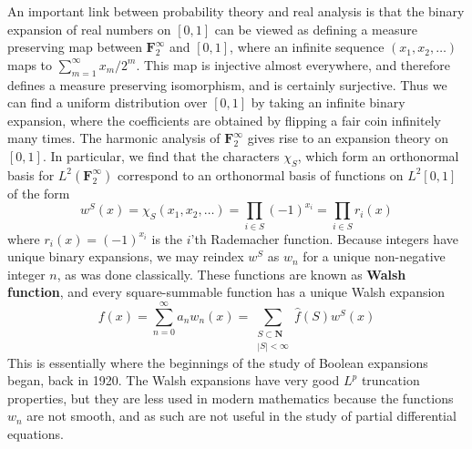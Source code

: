 An important link between probability theory and real analysis is that the binary expansion of real numbers on $[0,1]$ can be viewed as defining a measure preserving map between $\mathbf{F}_2^\infty$ and $[0,1]$, where an infinite sequence $(x_1, x_2, \dots)$ maps to $\sum_{m = 1}^\infty x_m/2^m$. This map is injective almost everywhere, and therefore defines a measure preserving isomorphism, and is certainly surjective. Thus we can find a uniform distribution over $[0,1]$ by taking an infinite binary expansion, where the coefficients are obtained by flipping a fair coin infinitely many times. The harmonic analysis of $\mathbf{F}_2^\infty$ gives rise to an expansion theory on $[0,1]$. In particular, we find that the characters $\chi_S$, which form an orthonormal basis for $L^2(\mathbf{F}_2^\infty)$ correspond to an orthonormal basis of functions on $L^2[0,1]$ of the form
%
\[ w^S(x) = \chi_S(x_1, x_2, \dots) = \prod_{i \in S} (-1)^{x_i} = \prod_{i \in S} r_i(x) \]
%
where $r_i(x) = (-1)^{x_i}$ is the $i$'th Rademacher function. Because integers have unique binary expansions, we may reindex $w^S$ as $w_n$ for a unique non-negative integer $n$, as was done classically. These functions are known as {\bf Walsh function}, and every square-summable function has a unique Walsh expansion
%
\[ f(x) = \sum_{n = 0}^\infty a_n w_n(x) = \sum_{\substack{S \subset \mathbf{N}\\ |S| < \infty}} \widehat{f}(S) w^S(x) \]
%
This is essentially where the beginnings of the study of Boolean expansions began, back in 1920. The Walsh expansions have very good $L^p$ truncation properties, but they are less used in modern mathematics because the functions $w_n$ are not smooth, and as such are not useful in the study of partial differential equations.

